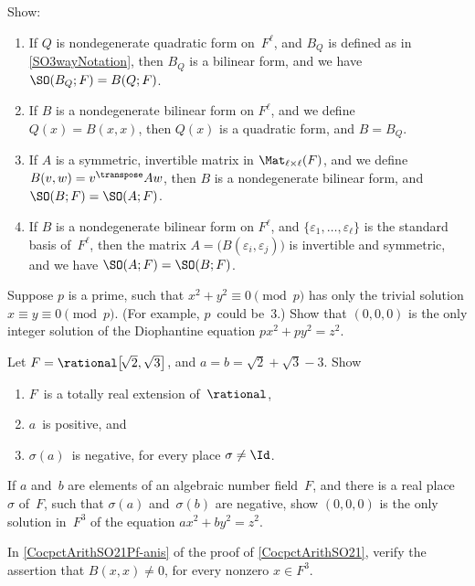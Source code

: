 \begin{exercises}

\item \label{SO3ways} 
Show:
	\begin{enumerate}
	\item If $Q$ is nondegenerate quadratic form on~$F^\ell$, and $B_Q$ is defined as in \cref{SO3wayNotation}, then $B_Q$ is a bilinear form, and we have $\SO(B_Q; F) = B(Q;F)$.
	\item If $B$ is a nondegenerate bilinear form on $F^\ell$, and we define $Q(x) = B(x,x)$, then $Q(x)$ is a quadratic form, and $B = B_Q$.
	\item If $A$ is a symmetric, invertible matrix in $\Mat_{\ell \times \ell}(F)$, and we define $B(v,w) = v^\transpose A w$, then $B$ is a nondegenerate bilinear form, and $\SO(B; F) = \SO(A;F)$.
	\item If $B$ is a nondegenerate bilinear form on $F^\ell$, and $\{\varepsilon_1,\ldots,\varepsilon_\ell\}$ is the standard basis of~$F^\ell$, then the matrix $A = \bigl( B(\varepsilon_i,\varepsilon_j) \bigr)$ is invertible and symmetric, and we have $\SO(A;F) = \SO(B;F)$.
	\end{enumerate}

\item \label{px2+py2<>z2}
 Suppose $p$ is a prime, such that $x^2 + y^2 \equiv 0
\pmod{p}$ has only the trivial solution $x \equiv y \equiv 0
\pmod{p}$. (For example, $p$~could be~$3$.) Show that
$(0,0,0)$ is the only integer solution of the Diophantine
equation $p x^2 + p y^2 = z^2$.

\item \label{sigma(ab)<0}
 Let $F = \rational \bigl[\! \sqrt{2}, \sqrt{3} \bigr]$, and
$a = b = \sqrt{2} + \sqrt{3} - 3$. Show 
 \begin{enumerate}
 \item $F$~is a totally real extension of~$\rational$, 
 \item $a$~is positive, and 
 \item $\sigma(a)$~is negative, for every place $\sigma
\neq \Id$.
 \end{enumerate}

\item \label{sigma(ab)neg->nosoln}
If $a$ and~$b$ are elements of an algebraic number
field~$F$, and there is a real place~$\sigma$ of~$F$,
such that $\sigma(a)$ and~$\sigma(b)$ are negative, show
$(0,0,0)$ is the only solution in~$F^3$ of the equation $a
x^2 + b y^2 = z^2$.

\item \label{isotrop->unip}
In \cref{CocpctArithSO21Pf-anis} of the proof of \cref{CocpctArithSO21}, verify the assertion that $B(x,x) \neq 0$, for every nonzero $x \in F^3$.


\end{exercises}
